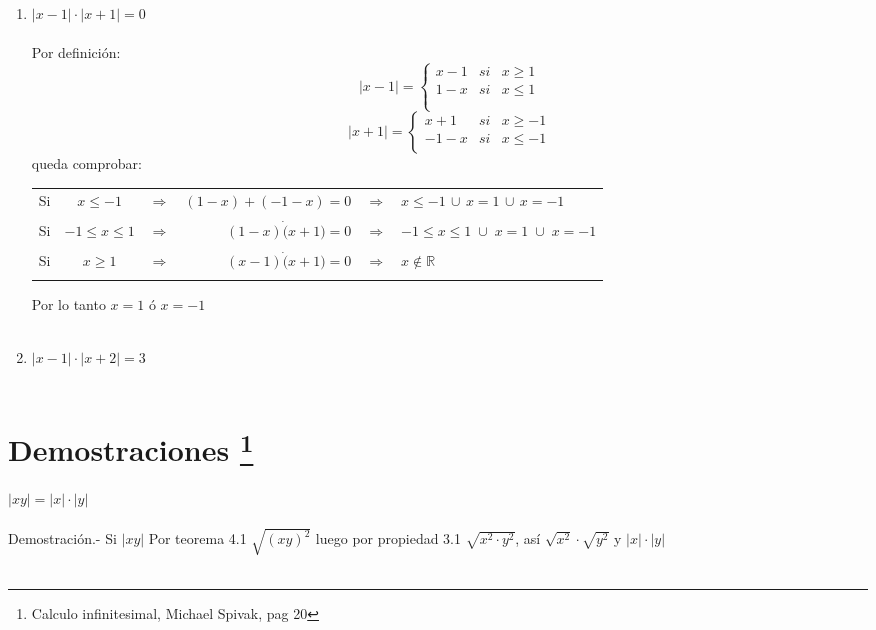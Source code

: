\begin{ej}
\begin{enumerate}[\bfseries (i)]
\item $|x-1|\cdot |x+1|=0$\\\\
Por definición:
\begin{equation}
|x-1| = \left\lbrace
\begin{array}{rcr}
  x-1& si & x\geq 1\\
 1-x& si & x \leq 1\\\\
\end{array}
\right.
\end{equation}
\begin{equation}
|x+1| = \left\lbrace
\begin{array}{rcr}
  x+1& si & x\geq -1\\
 -1-x& si & x \leq -1\\
\end{array}
\right.
\end{equation}
queda comprobar:\\
\begin{center}
\begin{tabular}{c c c r c l}
Si&$x\leq -1$&$\Rightarrow$&$(1-x)+(-1-x)=0$&$\Rightarrow$&$x\leq-1 \, \cup \, x = 1 \, \cup \, x=-1 $\\\\
Si&$-1\leq x \leq 1$&$\Rightarrow$&$(1-x)\dot (x+1)=0$&$\Rightarrow$&$-1\leq x \leq 1 \; \cup \; x=1 \; \cup \; x=-1$\\\\
Si&$x\geq 1$&$\Rightarrow$&$(x-1)\dot (x+1)=0$&$\Rightarrow $&$x \notin \mathbb{R}$\\\\
\end{tabular}
\end{center}
Por lo tanto $x=1$ \; ó \; $x=-1$\\\\

\item $|x-1|\cdot |x+2|= 3$
\\\\
\end{enumerate}
\end{ej}

\section[Demostraciones]{Demostraciones \footnote{Calculo infinitesimal, Michael Spivak, pag 20}}
\begin{teo}
$|xy|=|x|\cdot |y|$\\\\
Demostración.- \; Si $|xy|$ Por teorema 4.1 \; $\sqrt{(xy)^2}$ luego por propiedad 3.1 \; $\sqrt{x^2 \cdot y^2}$, así $\sqrt{x^2}\cdot \sqrt{y^2}$ \; y \;  $|x|\cdot |y|$\\\\
\end{teo}

